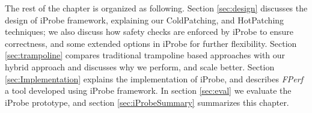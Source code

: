 The rest of the chapter is organized as following. 
Section \ref{sec:design} discusses the design of iProbe framework, explaining our ColdPatching, and HotPatching techniques;
we also discuss how safety checks are enforced by iProbe to ensure correctness, and some extended options in iProbe for further flexibility.
Section \ref{sec:trampoline} compares traditional trampoline based approaches with our hybrid approach and discusses why we perform, and scale better.
Section \ref{sec:Implementation} explains the implementation of iProbe, 
and describes \emph{FPerf} a tool developed using iProbe framework. 
In section \ref{sec:eval} we evaluate the iProbe prototype, 
and section \ref{sec:iProbeSummary} summarizes this chapter.
